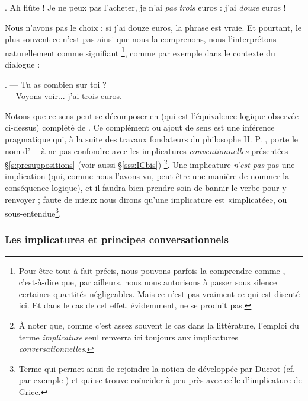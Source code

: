 \begin{refsegment}
\ex.  Ah flûte ! Je ne peux pas l'acheter, je n'ai \emph{pas} \emph{trois} euros : j'ai \emph{douze} euros !


Nous n'avons pas le choix : si j'ai douze euros, la phrase  est vraie.   Et pourtant, le plus souvent ce n'est pas ainsi que nous la comprenons, nous l'interprétons naturellement comme signifiant \footnote{Pour être tout à fait précis, nous pouvons parfois la comprendre comme , c'est-à-dire que, par ailleurs, nous nous autorisons à passer sous silence certaines quantités négligeables. Mais ce n'est pas vraiment ce qui est discuté ici. Et dans le cas de  cet effet, évidemment, ne se produit pas.}, comme par exemple dans le contexte du dialogue :

\ex.
--- Tu as combien sur toi ?\\
--- Voyons voir... j'ai trois euros.


Notons que ce sens  peut se décomposer en  (qui est l'équivalence logique observée ci-dessus) complété de .  
Ce complément ou ajout de sens est une inférence pragmatique qui, à la suite des travaux fondateurs du philosophe H. P. \citet{Grc:75}, porte le nom d' --~à ne pas confondre avec les implicatures \emph{conventionnelles}  présentées \S\ref{s:presuppositions} (voir aussi  \S\ref{sss:ICbis})%
\footnote{À noter que, comme c'est assez souvent le cas dans la littérature, l'emploi du terme \emph{implicature} seul renverra ici toujours aux implicatures \emph{conversationnelles}.}.
Une implicature \emph{n'est pas} pas une implication (qui, comme nous l'avons vu, peut être une manière de nommer la conséquence logique), et il faudra bien prendre soin de bannir le verbe  pour y renvoyer ; faute de mieux nous dirons qu'une implicature est «implicatée», ou sous-entendue\footnote{Terme qui permet ainsi de rejoindre la notion de  développée par Ducrot (cf. par exemple \citealt{Ducrot:84}) et qui se trouve coïncider à peu près avec celle d'implicature de Grice.}.


\subsubsection{Les implicatures et principes conversationnels}


\end{refsegment}
